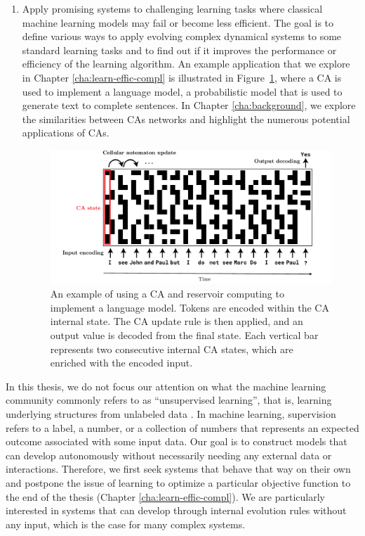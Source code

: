 \begin{enumerate}
  \item Apply promising systems to challenging learning tasks where classical
        machine learning models may fail or become less efficient. The goal is to
        define various ways to apply evolving complex dynamical systems to some
        standard learning tasks and to find out if it improves the performance
        or efficiency of the learning algorithm. An example application that we
        explore in Chapter \ref{cha:learn-effic-compl} is illustrated in
        Figure~\ref{fig:ca_lm}, where a \ac{CA} is used to implement a language
        model, a probabilistic model that is used to generate text to complete
        sentences. In Chapter \ref{cha:background}, we explore the similarities
        between \acp{CA} networks and highlight the numerous potential applications of \acp{CA}.
\begin{figure}[htbp]
  \centering
  \includegraphics[width=\linewidth]{figures/ca_lm}
  \caption{An example of using a \acl{CA} and reservoir computing to implement a
    language model. Tokens are encoded within the \acl{CA} internal state. The
    \acl{CA} update rule is then applied, and an output value is decoded from the
    final state. Each vertical bar represents two consecutive internal \ac{CA} states, which 
    are enriched with the encoded input.}
  \label{fig:ca_lm}
\end{figure}

\end{enumerate}

In this thesis, we do not focus our attention on what the machine learning
community commonly refers to as ``unsupervised learning'', that is, learning underlying
structures from unlabeled data
\parencite{hintonUnsupervisedLearningFoundations1999}. In machine learning,
supervision refers to a label, a number, or a collection of numbers that
represents an expected outcome associated with some input data. Our goal is to
construct models that can develop autonomously without necessarily needing any external data or
interactions. Therefore, we first seek systems that behave that way on their
own and postpone the issue of learning to optimize a particular objective
function to the end of the thesis (Chapter \ref{cha:learn-effic-compl}). 
We are particularly interested in systems that can develop through
internal evolution rules without any input, which is the case for many complex
systems.

